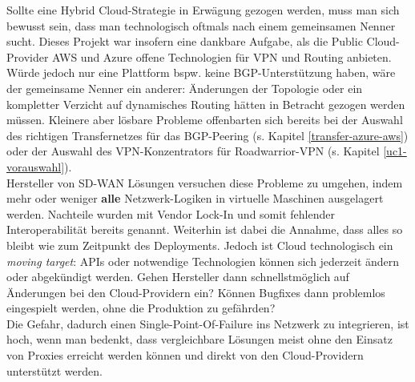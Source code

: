 Sollte eine Hybrid Cloud-Strategie in Erwägung gezogen werden, muss man sich bewusst sein, dass man technologisch oftmals nach einem gemeinsamen Nenner sucht. Dieses Projekt war insofern eine dankbare Aufgabe, als die Public Cloud-Provider AWS und Azure offene Technologien für VPN und Routing anbieten. Würde jedoch nur eine Plattform bspw. keine BGP-Unterstützung haben, wäre der gemeinsame Nenner ein anderer: Änderungen der Topologie oder ein kompletter Verzicht auf dynamisches Routing hätten in Betracht gezogen werden müssen. Kleinere aber lösbare Probleme offenbarten sich bereits bei der Auswahl des richtigen Transfernetzes für das BGP-Peering (s. Kapitel \ref{transfer-azure-aws}) oder der Auswahl des VPN-Konzentrators für Roadwarrior-VPN (s. Kapitel \ref{uc1-vorauswahl}).\\
Hersteller von SD-WAN Lösungen versuchen diese Probleme zu umgehen, indem mehr oder weniger \textbf{alle} Netzwerk-Logiken in virtuelle Maschinen ausgelagert werden. Nachteile wurden mit Vendor Lock-In und somit fehlender Interoperabilität bereits genannt. Weiterhin ist dabei die Annahme, dass alles so bleibt wie zum Zeitpunkt des \gls{Deployment}s. Jedoch ist Cloud technologisch ein \textit{moving target}: APIs oder notwendige Technologien können sich jederzeit ändern oder abgekündigt werden\cite{Yegge2020}. Gehen Hersteller dann schnellstmöglich auf Änderungen bei den Cloud-Providern ein? Können Bugfixes dann problemlos eingespielt werden, ohne die Produktion zu gefährden?\\ 
Die Gefahr, dadurch einen Single-Point-Of-Failure ins Netzwerk zu integrieren, ist hoch, wenn man bedenkt, dass vergleichbare Lösungen meist ohne den Einsatz von \glqq Proxies\grqq{} erreicht werden können und direkt von den Cloud-Providern unterstützt werden.
